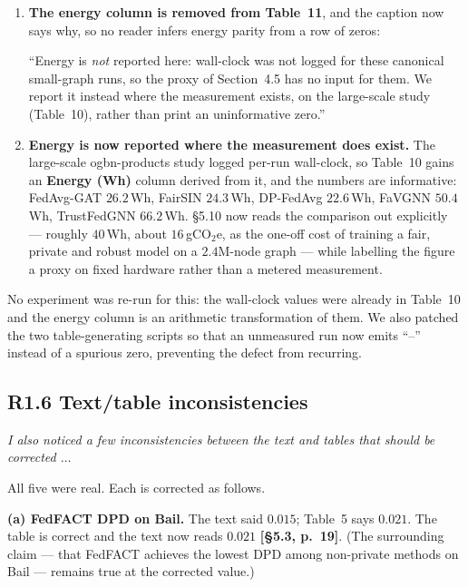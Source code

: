 \documentclass[11pt,a4paper]{article}
\newenvironment{comment}
  {\begin{mdframed}[backgroundcolor=quotegray,linewidth=0pt,skipabove=8pt,
    skipbelow=6pt,innertopmargin=6pt,innerbottommargin=6pt]\itshape}
  {\end{mdframed}}
\newenvironment{newtextbox}
  {\begin{mdframed}[linecolor=newtext!45,linewidth=0.8pt,skipabove=6pt,
    skipbelow=8pt,innertopmargin=6pt,innerbottommargin=6pt]\small}
  {\end{mdframed}}
\newcommand{\where}[1]{\textcolor{revblue}{\textbf{[#1]}}}
\begin{document}
\begin{enumerate}[leftmargin=1.4em,itemsep=2pt]
\item \textbf{The energy column is removed from Table~11}, and the caption now
says why, so no reader infers energy parity from a row of zeros:
\begin{newtextbox}
``Energy is \emph{not} reported here: wall-clock was not logged for these
canonical small-graph runs, so the proxy of Section~4.5 has no input for them.
We report it instead where the measurement exists, on the large-scale study
(Table~10), rather than print an uninformative zero.''
\end{newtextbox}
\item \textbf{Energy is now reported where the measurement does exist.} The
large-scale ogbn-products study logged per-run wall-clock, so Table~10 gains an
\textbf{Energy (Wh)} column derived from it, and the numbers are informative:
FedAvg-GAT $26.2$\,Wh, FairSIN $24.3$\,Wh, DP-FedAvg $22.6$\,Wh, FaVGNN
$50.4$\,Wh, TrustFedGNN $66.2$\,Wh. \S5.10 now reads the comparison out
explicitly --- roughly $40$\,Wh, about $16$\,gCO$_2$e, as the one-off cost of
training a fair, private and robust model on a $2.4$M-node graph --- while
labelling the figure a proxy on fixed hardware rather than a metered
measurement.
\end{enumerate}

No experiment was re-run for this: the wall-clock values were already in
Table~10 and the energy column is an arithmetic transformation of them. We also
patched the two table-generating scripts so that an unmeasured run now emits
``--'' instead of a spurious zero, preventing the defect from recurring.

\subsection*{R1.6 Text/table inconsistencies}
\label{sec:r1-6}

\begin{comment}
I also noticed a few inconsistencies between the text and tables that should be
corrected $\dots$
\end{comment}

All five were real. Each is corrected as follows.

\textbf{(a) FedFACT DPD on Bail.} The text said $0.015$; Table~5 says $0.021$.
The table is correct and the text now reads $0.021$ \where{\S5.3, p.~19}. (The
surrounding claim --- that FedFACT achieves the lowest DPD among non-private
methods on Bail --- remains true at the corrected value.)
\end{document}
